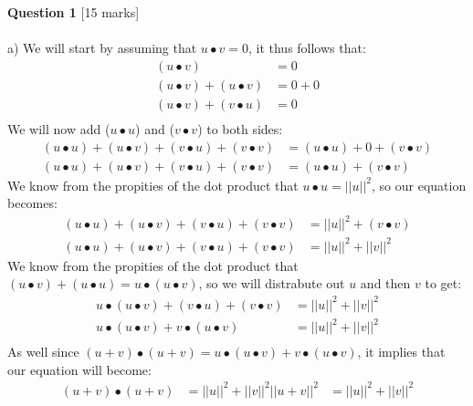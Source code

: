 \documentclass[11pt]{article}
\begin{document}
\textbf{Question 1} [15 marks] \\\\
a) We will start by assuming that $u \bullet v = 0$, it thus follows that:
\begin{align*}
(u \bullet v)  &= 0 \\
(u \bullet v)  + (u \bullet v) &= 0 + 0\\
(u \bullet v) + (v \bullet u) &= 0\\
\end{align*}
We will now add ($u \bullet u$) and ($v \bullet v$) to both sides:
\begin{align*}
(u \bullet u) + (u \bullet v)  + (v \bullet u) + (v \bullet v)  &=(u \bullet u) + 0 + (v \bullet v)\\
(u \bullet u) + (u \bullet v)  + (v \bullet u) + (v \bullet v)  &=(u \bullet u) + (v \bullet v)
\end{align*}
We know from the propities of the dot product that $u\bullet u = ||u||^2$, so our equation becomes:
\begin{align*}
(u \bullet u) + (u \bullet v)  + (v \bullet u) + (v \bullet v)  &=||u||^2 + (v \bullet v)\\
(u \bullet u) + (u \bullet v)  + (v \bullet u) + (v \bullet v)  &=||u||^2 + ||v||^2
\end{align*}
We know from the propities of the dot product that $(u \bullet v) + (u \bullet u) = u \bullet (u\bullet v)$, so we will distrabute out $u$ and then $v$ to get:
\begin{align*}
u \bullet (u \bullet v)  + (v \bullet u) + (v \bullet v)  &=||u||^2 + ||v||^2\\
u \bullet (u \bullet v) +  v \bullet (u \bullet v) &=||u||^2 + ||v||^2\\
\end{align*}
As well since $(u + v) \bullet (u + v)  = u \bullet (u \bullet v) +  v \bullet (u \bullet v)$, it implies that our equation will become:
\begin{align*}
(u + v) \bullet (u + v) &=||u||^2 + ||v||^2
||u + v||^2 &=||u||^2 + ||v||^2
\end{align*}
\end{document}
